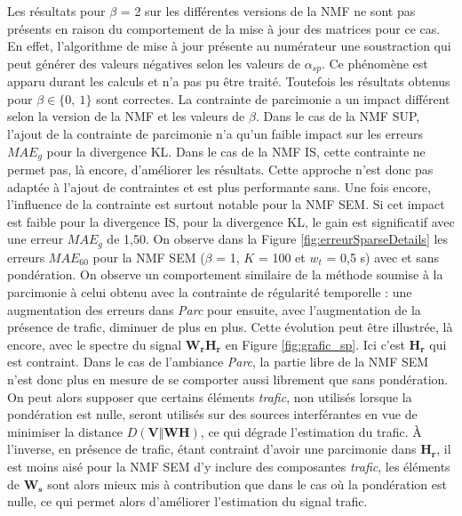 Les résultats pour $\beta$ = 2 sur les différentes versions de la NMF ne sont pas présents en raison du comportement de la mise à jour des matrices pour ce cas. En effet, l'algorithme de mise à jour présente au numérateur une soustraction qui peut générer des valeurs négatives selon les valeurs de $\alpha_{sp}$. Ce phénomène est apparu durant les calculs et n'a pas pu être traité. Toutefois les résultats obtenus pour $\beta \in \lbrace 0,~1\rbrace$ sont correctes.
La contrainte de parcimonie a un impact différent selon la version de la NMF et les valeurs de $\beta$. Dans le cas de la NMF SUP, l'ajout de la contrainte de parcimonie n'a qu'un faible impact sur les erreurs $MAE_g$ pour la divergence KL.  Dans le cas de la NMF IS, cette contrainte ne permet pas, là encore, d'améliorer les résultats. Cette approche n'est donc pas adaptée à l'ajout de contraintes et est plus performante sans.
Une fois encore, l'influence de la contrainte est surtout notable pour la NMF SEM. Si cet impact est faible pour la divergence IS, pour la divergence KL, le gain est significatif avec une erreur $MAE_g$ de 1,50. On observe dans la Figure  \ref{fig:erreurSparseDetails} les erreurs $MAE_{60}$ pour la NMF SEM ($\beta$ = 1, $K$ = 100 et $w_t$ = 0,5 s) avec et sans pondération. On observe un comportement similaire de la méthode soumise à la parcimonie à celui obtenu avec la contrainte de régularité temporelle : une augmentation des erreurs dans \textit{Parc} pour ensuite, avec l'augmentation de la présence de trafic, diminuer de plus en plus. Cette évolution peut être illustrée, là encore, avec le spectre du signal $\mathbf{W_rH_r}$ en Figure \ref{fig:grafic_sp}. Ici c'est $\mathbf{H_r}$ qui est contraint. Dans le cas de l'ambiance \textit{Parc}, la partie libre de la NMF SEM n'est donc plus en mesure de se comporter aussi librement que sans pondération. On peut alors supposer que certains éléments \textit{trafic}, non utilisés lorsque la pondération est nulle, seront utilisés sur des sources interférantes en vue de minimiser la distance $D(\mathbf{V}\Vert \mathbf{WH})$, ce qui dégrade l'estimation du trafic.
\`A l'inverse, en présence de trafic, étant contraint d'avoir une parcimonie dans $\mathbf{H_r}$, il est moins aisé pour la NMF SEM d'y inclure des composantes \textit{trafic}, les éléments de $\mathbf{W_s}$ sont alors mieux mis à contribution que dans le cas où la pondération est nulle, ce qui permet alors d'améliorer l'estimation du signal trafic.

